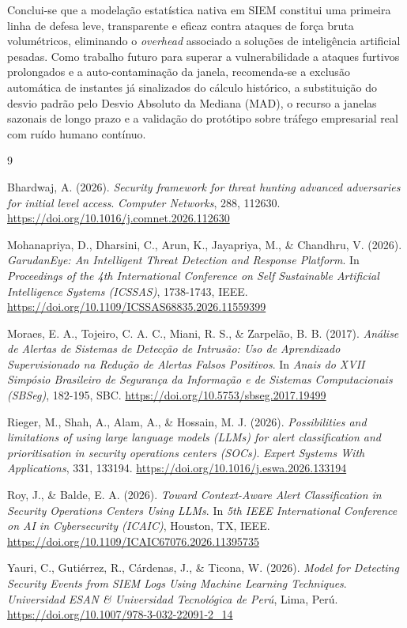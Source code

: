 \documentclass[12pt,a4paper]{article}
\begin{document}
Conclui-se que a modelação estatística nativa em SIEM constitui uma primeira linha de defesa leve, transparente e eficaz contra ataques de força bruta volumétricos, eliminando o \textit{overhead} associado a soluções de inteligência artificial pesadas. Como trabalho futuro para superar a vulnerabilidade a ataques furtivos prolongados e a auto-contaminação da janela, recomenda-se a exclusão automática de instantes já sinalizados do cálculo histórico, a substituição do desvio padrão pelo Desvio Absoluto da Mediana (MAD), o recurso a janelas sazonais de longo prazo e a validação do protótipo sobre tráfego empresarial real com ruído humano contínuo.

\newpage
\renewcommand\refname{Referências}
\begin{thebibliography}{9}

Bhardwaj, A. (2026).
\textit{Security framework for threat hunting advanced adversaries for initial level access}. \textit{Computer Networks}, 288, 112630. \url{https://doi.org/10.1016/j.comnet.2026.112630}

Mohanapriya, D., Dharsini, C., Arun, K., Jayapriya, M., \& Chandhru, V. (2026).
\textit{GarudanEye: An Intelligent Threat Detection and Response Platform}. In \textit{Proceedings of the 4th International Conference on Self Sustainable Artificial Intelligence Systems (ICSSAS)}, 1738-1743, IEEE. \url{https://doi.org/10.1109/ICSSAS68835.2026.11559399}

Moraes, E. A., Tojeiro, C. A. C., Miani, R. S., \& Zarpelão, B. B. (2017).
\textit{Análise de Alertas de Sistemas de Detecção de Intrusão: Uso de Aprendizado Supervisionado na Redução de Alertas Falsos Positivos}. In \textit{Anais do XVII Simpósio Brasileiro de Segurança da Informação e de Sistemas Computacionais (SBSeg)}, 182-195, SBC.
\url{https://doi.org/10.5753/sbseg.2017.19499}

Rieger, M., Shah, A., Alam, A., \& Hossain, M. J. (2026).
\textit{Possibilities and limitations of using large language models (LLMs) for alert classification and prioritisation in security operations centers (SOCs)}. \textit{Expert Systems With Applications}, 331, 133194. \url{https://doi.org/10.1016/j.eswa.2026.133194}

Roy, J., \& Balde, E. A. (2026).
\textit{Toward Context-Aware Alert Classification in Security Operations Centers Using LLMs}. In \textit{5th IEEE International Conference on AI in Cybersecurity (ICAIC)}, Houston, TX, IEEE.
\url{https://doi.org/10.1109/ICAIC67076.2026.11395735}

Yauri, C., Gutiérrez, R., Cárdenas, J., \& Ticona, W. (2026).
\textit{Model for Detecting Security Events from SIEM Logs Using Machine Learning Techniques}. \textit{Universidad ESAN \& Universidad Tecnológica de Perú}, Lima, Perú.
\url{https://doi.org/10.1007/978-3-032-22091-2_14}

\end{thebibliography}
\end{document}
